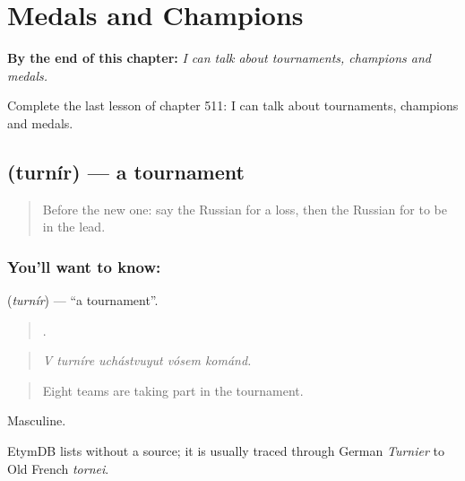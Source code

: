 
\chapter{Medals and Champions}
\label{ch:ru-medals-and-champions}

\begin{chapteropening}
\textbf{By the end of this chapter:} \emph{I can talk about tournaments, champions and medals.}

Complete the last lesson of chapter 511: I can talk about tournaments, champions and medals.
\end{chapteropening}

\section[\texorpdfstring{\ru{турнир} (turnír)}{турнир (turnír)}]{ (turnír) — a tournament}

\label{lesson:RU-C511-turnir}



\begin{quote}
Before the new one: say the Russian for a loss, then the Russian for to be in the lead.
\end{quote}

\subsection*{You'll want to know: }
\textbf{} (\emph{turnír}) — \textquotedblleft{}a tournament\textquotedblright{}.

\begin{quote}
    .
\end{quote}

\begin{quote}
\emph{V turníre uchástvuyut vósem kománd.}
\end{quote}

\begin{quote}
Eight teams are taking part in the tournament.
\end{quote}

Masculine.

\begin{cousinweb}
EtymDB lists \emph{} without a source; it is usually traced through German \emph{Turnier} to Old French \emph{tornei}.
\end{cousinweb}

